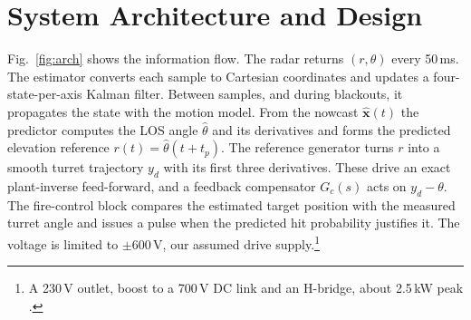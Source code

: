 \documentclass[conference]{IEEEtran}
\begin{document}
\section{System Architecture and Design}
Fig.~\ref{fig:arch} shows the information flow. The radar returns $(r,\theta)$ every 50\,ms. The estimator converts each sample to Cartesian coordinates and updates a four-state-per-axis Kalman filter. Between samples, and during blackouts, it propagates the state with the motion model. From the nowcast $\hat{\mathbf x}(t)$ the predictor computes the LOS angle $\hat\theta$ and its derivatives and forms the predicted elevation reference $r(t)=\hat\theta(t+t_p)$. The reference generator turns $r$ into a smooth turret trajectory $y_d$ with its first three derivatives. These drive an exact plant-inverse feed-forward, and a feedback compensator $G_c(s)$ acts on $y_d-\theta$. The fire-control block compares the estimated target position with the measured turret angle and issues a pulse when the predicted hit probability justifies it. The voltage is limited to $\pm600$\,V, our assumed drive supply.\footnote{A 230\,V outlet, boost to a 700\,V DC link and an H-bridge, about 2.5\,kW peak \cite{mohan2003}.}
\end{document}
